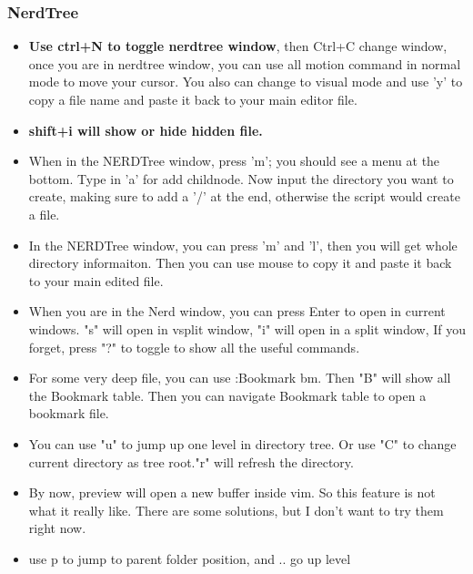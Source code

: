 \documentclass[paper=8.5in:11in, twoside, 12pt, pagesize=pdftex]{book}
\begin{document}
	\subsubsection{NerdTree}
	\begin{itemize}
		
		\item \textbf{Use ctrl+N to toggle nerdtree window}, then Ctrl+C change window, once you are in nerdtree window, you can use all motion command in normal mode to move your cursor. You also can change to visual mode and use 'y' to copy a file name and paste it back to your main editor file.  
		
		\item \textbf{shift+i will show or hide hidden file.}
		
		\item When in the NERDTree window, press 'm'; you should see a menu at the bottom. Type in 'a' for add childnode. Now input the directory you want to create, making sure to add a '/' at the end, otherwise the script would create a file.
		
		\item In the NERDTree window, you can press 'm' and 'l', then you will get whole directory informaiton. Then you can use mouse to copy it and paste it back to your main edited file.
		
		\item When you are in the Nerd window, you can press Enter to open in current windows. "s" will open in vsplit window, "i" will open in a split window, If you forget, press "?" to toggle to show all the useful commands.
		
		\item For some very deep file, you can use :Bookmark bm. Then "B" will show all the Bookmark table. Then you can navigate Bookmark table to open a bookmark file.
		
		\item You can use "u" to jump up one level in directory tree. Or use "C" to change current directory as tree root."r" will refresh the directory.
		
		\item By now, preview will open a new buffer inside vim. So this feature is not what it really like. There are some solutions, but I don't want to try them right now.
		
		\item use p to jump to parent folder position, and .. go up level
	\end{itemize}
	
\end{document}
